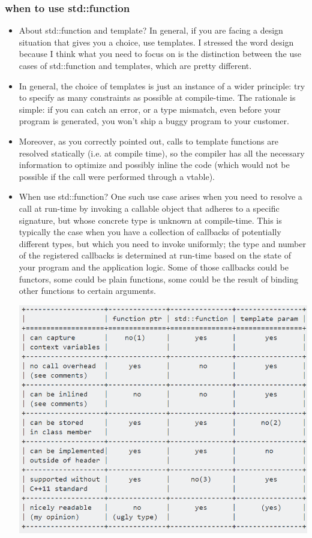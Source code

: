 \documentclass[a4paper,11pt,twoside]{book}
\begin{document}
\subsubsection{when to use std::function}
\begin{itemize}
	\item About std::function and template? In general, if you are facing a design situation that gives you a choice, use templates. I stressed the word design because I think what you need to focus on is the distinction between the use cases of std::function and templates, which are pretty different.
	
	\item In general, the choice of templates is just an instance of a wider principle: try to specify as many constraints as possible at compile-time. The rationale is simple: if you can catch an error, or a type mismatch, even before your program is generated, you won't ship a buggy program to your customer.
	
	\item Moreover, as you correctly pointed out, calls to template functions are resolved statically (i.e. at compile time), so the compiler has all the necessary information to optimize and possibly inline the code (which would not be possible if the call were performed through a vtable).
	
	
	\item When use std::function? One such use case arises when you need to resolve a call at run-time by invoking a callable object that adheres to a specific signature, but whose concrete type is unknown at compile-time. This is typically the case when you have a collection of callbacks of potentially different types, but which you need to invoke uniformly; the type and number of the registered callbacks is determined at run-time based on the state of your program and the application logic. Some of those callbacks could be functors, some could be plain functions, some could be the result of binding other functions to certain arguments.
	
	\includegraphics[scale=0.9]{pics/function.png} 
\end{itemize}
\end{document}
